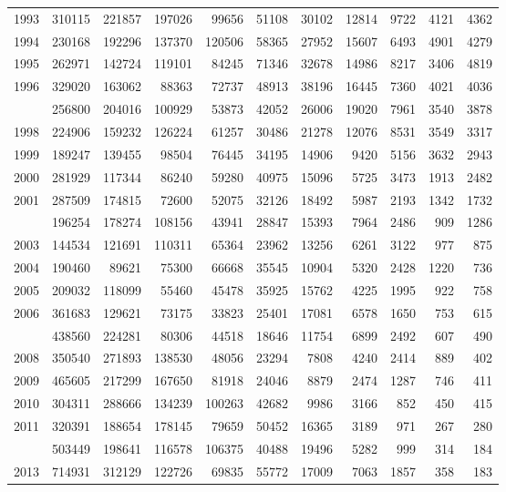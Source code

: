 \documentclass[
]{article}
\begin{document}
\begin{longtable}[t]{lrrrrrrrrrr}
1993 & 310115 & 221857 & 197026 & 99656 & 51108 & 30102 & 12814 & 9722 & 4121 & 4362\\
1994 & 230168 & 192296 & 137370 & 120506 & 58365 & 27952 & 15607 & 6493 & 4901 & 4279\\
1995 & 262971 & 142724 & 119101 & 84245 & 71346 & 32678 & 14986 & 8217 & 3406 & 4819\\
1996 & 329020 & 163062 & 88363 & 72737 & 48913 & 38196 & 16445 & 7360 & 4021 & 4036\\
\addlinespace
1997 & 256800 & 204016 & 100929 & 53873 & 42052 & 26006 & 19020 & 7961 & 3540 & 3878\\
1998 & 224906 & 159232 & 126224 & 61257 & 30486 & 21278 & 12076 & 8531 & 3549 & 3317\\
1999 & 189247 & 139455 & 98504 & 76445 & 34195 & 14906 & 9420 & 5156 & 3632 & 2943\\
2000 & 281929 & 117344 & 86240 & 59280 & 40975 & 15096 & 5725 & 3473 & 1913 & 2482\\
2001 & 287509 & 174815 & 72600 & 52075 & 32126 & 18492 & 5987 & 2193 & 1342 & 1732\\
\addlinespace
2002 & 196254 & 178274 & 108156 & 43941 & 28847 & 15393 & 7964 & 2486 & 909 & 1286\\
2003 & 144534 & 121691 & 110311 & 65364 & 23962 & 13256 & 6261 & 3122 & 977 & 875\\
2004 & 190460 & 89621 & 75300 & 66668 & 35545 & 10904 & 5320 & 2428 & 1220 & 736\\
2005 & 209032 & 118099 & 55460 & 45478 & 35925 & 15762 & 4225 & 1995 & 922 & 758\\
2006 & 361683 & 129621 & 73175 & 33823 & 25401 & 17081 & 6578 & 1650 & 753 & 615\\
\addlinespace
2007 & 438560 & 224281 & 80306 & 44518 & 18646 & 11754 & 6899 & 2492 & 607 & 490\\
2008 & 350540 & 271893 & 138530 & 48056 & 23294 & 7808 & 4240 & 2414 & 889 & 402\\
2009 & 465605 & 217299 & 167650 & 81918 & 24046 & 8879 & 2474 & 1287 & 746 & 411\\
2010 & 304311 & 288666 & 134239 & 100263 & 42682 & 9986 & 3166 & 852 & 450 & 415\\
2011 & 320391 & 188654 & 178145 & 79659 & 50452 & 16365 & 3189 & 971 & 267 & 280\\
\addlinespace
2012 & 503449 & 198641 & 116578 & 106375 & 40488 & 19496 & 5282 & 999 & 314 & 184\\
2013 & 714931 & 312129 & 122726 & 69835 & 55772 & 17009 & 7063 & 1857 & 358 & 183\\

\end{longtable}
\end{document}
